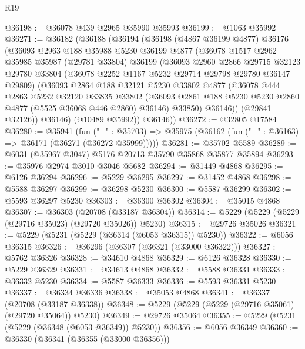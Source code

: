 \begin{lexlean}{R19}
\begin{coremodule}
@36198 := @36078 @439 @2965 @35990 @35993
@36199 := @1063 @35992
@36271 := @36182
    (@36188
      (@36194
        (@36198
          (@4867 @36199 @4877)
          @36176
          (@36093
            @2963
            @188
            @35988
            @5230
            @36199
            @4877
            (@36078
              @1517
              @2962
              @35985
              @35987
              (@29781 @33804)
              @36199
              (@36093
                @2960
                @2866
                @29715
                @32123
                @29780
                @33804
                (@36078 @2252 @1167 @5232 @29714 @29798 @29780 @36147 @29809)
                (@36093
                  @2864
                  @188
                  @32121
                  @5230
                  @33802
                  @4877
                  (@36078
                    @444
                    @2863
                    @5232
                    @32120
                    @33835
                    @33802
                    (@36093 @2861 @188 @5230 @5230 @2860 @4877 (@5525 @36068 @446 @2860) @36146)
                    @33850)
                  @36146))
              (@29841 @32126))
            @36146)
          (@10489 @35992))
        @36146))
@36272 := @32805 @17584
@36280 := @35941
    (fun ("_" : @35703) => @35975 (@36162 (fun ("_" : @36163) => @36171 (@36271 (@36272 @35999)))))
@36281 := @35702 @5589
@36289 := @6031 (@35967 @3047) @5176 @20713 @35790 @35868 @35877 @35894
@36293 := @35976 @2974 @3010 @3046 @5682
@36294 := @31449 @4868
@36295 := @6126 @36294
@36296 := @5229 @36295
@36297 := @31452 @4868
@36298 := @5588 @36297
@36299 := @36298 @5230
@36300 := @5587 @36299
@36302 := @5593 @36297 @5230
@36303 := @36300 @36302
@36304 := @35015 @4868
@36307 := @36303 (@20708 (@33187 @36304))
@36314 := @5229 (@5229 (@5229 (@29716 @35023) (@29720 @35026)) @5230)
@36315 := @29726 @35026
@36321 := @5229 (@5231 (@5229 (@36314 (@6053 @36315)) @5230))
@36322 := @6056 @36315
@36326 := @36296 (@36307 (@36321 (@33000 @36322)))
@36327 := @5762 @36326
@36328 := @34610 @4868
@36329 := @6126 @36328
@36330 := @5229 @36329
@36331 := @34613 @4868
@36332 := @5588 @36331
@36333 := @36332 @5230
@36334 := @5587 @36333
@36336 := @5593 @36331 @5230
@36337 := @36334 @36336
@36338 := @35053 @4868
@36341 := @36337 (@20708 (@33187 @36338))
@36348 := @5229 (@5229 (@5229 (@29716 @35061) (@29720 @35064)) @5230)
@36349 := @29726 @35064
@36355 := @5229 (@5231 (@5229 (@36348 (@6053 @36349)) @5230))
@36356 := @6056 @36349
@36360 := @36330 (@36341 (@36355 (@33000 @36356)))

\end{coremodule}
\end{lexlean}
